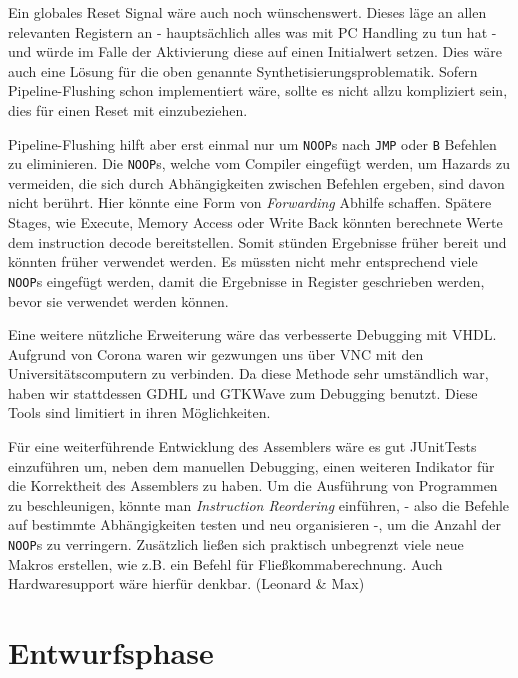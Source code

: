 \documentclass[paper=a4,fontsize=12pt,twocolumn]{scrreprt}
\begin{document}
Ein globales Reset Signal wäre auch noch wünschenswert.
Dieses läge an allen relevanten Registern an - hauptsächlich alles was mit PC Handling zu tun hat - und würde im Falle der Aktivierung diese auf einen Initialwert setzen.
Dies wäre auch eine Lösung für die oben genannte Synthetisierungsproblematik.
Sofern Pipeline-Flushing schon implementiert wäre, sollte es nicht allzu kompliziert sein, dies für einen Reset mit einzubeziehen.

Pipeline-Flushing hilft aber erst einmal nur um \texttt{NOOP}s nach \texttt{JMP} oder \texttt{B} Befehlen zu eliminieren.
Die \texttt{NOOP}s, welche vom Compiler eingefügt werden, um Hazards zu vermeiden, die sich durch Abhängigkeiten zwischen Befehlen ergeben, sind davon nicht berührt.
Hier könnte eine Form von \textit{Forwarding} \autocite{forwarding} Abhilfe schaffen.
Spätere Stages, wie Execute, Memory Access oder Write Back könnten berechnete Werte dem instruction decode bereitstellen.
Somit stünden Ergebnisse früher bereit und könnten früher verwendet werden.
Es müssten nicht mehr entsprechend viele \texttt{NOOP}s eingefügt werden, damit die Ergebnisse in Register geschrieben werden, bevor sie verwendet werden können.

Eine weitere nützliche Erweiterung wäre das verbesserte Debugging mit VHDL.
Aufgrund von Corona waren wir gezwungen uns über VNC mit den Universitätscomputern zu verbinden.
Da diese Methode sehr umständlich war, haben wir stattdessen GDHL und GTKWave zum Debugging benutzt.
Diese Tools sind limitiert in ihren Möglichkeiten.

Für eine weiterführende Entwicklung des Assemblers wäre es gut JUnitTests einzuführen um, neben dem manuellen Debugging, einen weiteren Indikator für die Korrektheit des Assemblers zu haben. 
Um die Ausführung von Programmen zu beschleunigen, könnte man \textit{Instruction Reordering} \autocite{instructionreordering} einführen, - also die Befehle auf bestimmte Abhängigkeiten testen und neu organisieren -, um die Anzahl der \texttt{NOOP}s zu verringern.
Zusätzlich ließen sich praktisch unbegrenzt viele neue Makros erstellen, wie z.B. ein Befehl für Fließkommaberechnung.
Auch Hardwaresupport wäre hierfür denkbar.
(Leonard \& Max)

\printbibliography

\onecolumn
\appendix

\chapter{Entwurfsphase}
\end{document}
